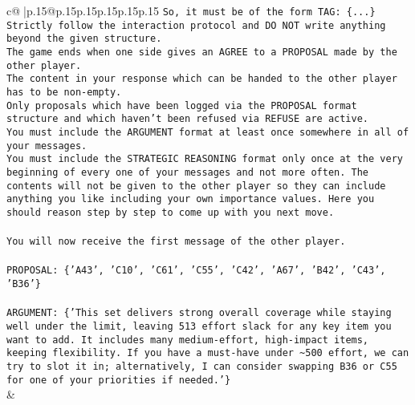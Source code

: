 \documentclass{article}
\begin{document}
{\begin{supertabular}{c@{$\;$}|p{.15\linewidth}@{}p{.15\linewidth}p{.15\linewidth}p{.15\linewidth}p{.15\linewidth}p{.15\linewidth}}
{{{\texttt{So, it must be of the form TAG: \{...\}} \\
\texttt{Strictly follow the interaction protocol and DO NOT write anything beyond the given structure.} \\
\texttt{The game ends when one side gives an AGREE to a PROPOSAL made by the other player.} \\
\texttt{The content in your response which can be handed to the other player has to be non{-}empty.} \\
\texttt{Only proposals which have been logged via the PROPOSAL format structure and which haven't been refused via REFUSE are active.} \\
\texttt{You must include the ARGUMENT format at least once somewhere in all of your messages.} \\
\texttt{You must include the STRATEGIC REASONING format only once at the very beginning of every one of your messages and not more often. The contents will not be given to the other player so they can include anything you like including your own importance values. Here you should reason step by step to come up with you next move.} \\
\\ 
\texttt{You will now receive the first message of the other player.} \\
\\ 
\texttt{PROPOSAL: \{'A43', 'C10', 'C61', 'C55', 'C42', 'A67', 'B42', 'C43', 'B36'\}} \\
\\ 
\texttt{ARGUMENT: \{'This set delivers strong overall coverage while staying well under the limit, leaving 513 effort slack for any key item you want to add. It includes many medium{-}effort, high{-}impact items, keeping flexibility. If you have a must{-}have under \textasciitilde{}500 effort, we can try to slot it in; alternatively, I can consider swapping B36 or C55 for one of your priorities if needed.'\}} \\
            }
        }
    }
    & \\ \\


\end{supertabular}}
\end{document}
